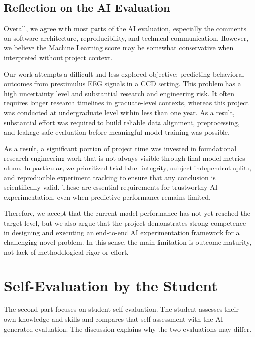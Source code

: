 \subsection{Reflection on the AI Evaluation}
\label{subsec:reflection-ai}

Overall, we agree with most parts of the AI evaluation, especially the comments on software
architecture, reproducibility, and technical communication. However, we believe the Machine
Learning score may be somewhat conservative when interpreted without project context.

Our work attempts a difficult and less explored objective: predicting behavioral outcomes from
prestimulus EEG signals in a CCD setting. This problem has a high uncertainty level and
substantial research and engineering risk. It often requires longer research timelines in
graduate-level contexts, whereas this project was conducted at undergraduate level within less
than one year. As a result, substantial effort was required to build reliable data alignment,
preprocessing, and leakage-safe evaluation before meaningful model training was possible.

As a result, a significant portion of project time was invested in foundational research
engineering work that is not always visible through final model metrics alone. In particular,
we prioritized trial-label integrity, subject-independent splits, and reproducible experiment
tracking to ensure that any conclusion is scientifically valid. These are essential requirements
for trustworthy AI experimentation, even when predictive performance remains limited.

Therefore, we accept that the current model performance has not yet reached the target level,
but we also argue that the project demonstrates strong competence in designing and executing
an end-to-end AI experimentation framework for a challenging novel problem. In this sense,
the main limitation is outcome maturity, not lack of methodological rigor or effort.

\section{Self-Evaluation by the Student}
\label{sec:self-evaluation}

The second part focuses on student self-evaluation. The student assesses their own knowledge
and skills and compares that self-assessment with the AI-generated evaluation. The discussion
explains why the two evaluations may differ.

